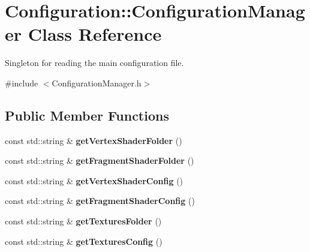 \hypertarget{class_configuration_1_1_configuration_manager}{}\section{Configuration\+::Configuration\+Manager Class Reference}
\label{class_configuration_1_1_configuration_manager}


Singleton for reading the main configuration file.  




{\ttfamily \#include $<$Configuration\+Manager.\+h$>$}

\subsection*{Public Member Functions}
\begin{DoxyCompactItemize}
\item 
\mbox{\label{class_configuration_1_1_configuration_manager_a481b4f067140f44cef6dcd79cd62f429}} 
const std\+::string \& {\bfseries get\+Vertex\+Shader\+Folder} ()
\item 
\mbox{\label{class_configuration_1_1_configuration_manager_ab822b16178695656a0ca3829c1155a94}} 
const std\+::string \& {\bfseries get\+Fragment\+Shader\+Folder} ()
\item 
\mbox{\label{class_configuration_1_1_configuration_manager_ab003f843dbb4e388c6352c270ca816ce}} 
const std\+::string \& {\bfseries get\+Vertex\+Shader\+Config} ()
\item 
\mbox{\label{class_configuration_1_1_configuration_manager_ad624c54720c7de3b6bff106f0f29e10c}} 
const std\+::string \& {\bfseries get\+Fragment\+Shader\+Config} ()
\item 
\mbox{\label{class_configuration_1_1_configuration_manager_a33738b081774fbf2acea6e651402edfc}} 
const std\+::string \& {\bfseries get\+Textures\+Folder} ()
\item 
\mbox{\label{class_configuration_1_1_configuration_manager_a7420ab7a7ef1207fecbc20ef15b239fb}} 
const std\+::string \& {\bfseries get\+Textures\+Config} ()
\end{DoxyCompactItemize}
